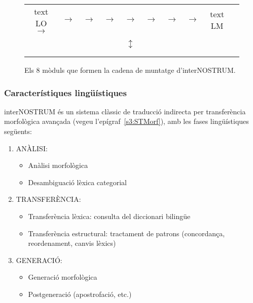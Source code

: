 \begin{figure}
{\small
\setlength{\tabcolsep}{0.5mm}
\begin{center}
\begin{tabular}{cccccccccc}
\\
\parbox{0.7cm}{text LO} $\rightarrow$ &
 $\rightarrow$ &
  $\rightarrow$ &
 $\rightarrow$ &  $\rightarrow$ &
$\rightarrow$ & 
$\rightarrow$ &  $\rightarrow$ &
\parbox{0.7cm}{text LM}\\\\
& &  & & $\updownarrow$   & \\\\
& &
 &  &                 &   \\
\end{tabular}
\end{center}
}
\caption{Els 8 mòduls que formen la cadena de muntatge d'interNOSTRUM.}
\label{fg:modules}
\end{figure}


\subsubsection{Característiques lingüístiques}

{\sf interNOSTRUM} és un sistema clàssic de traducció indirecta per
transferència morfològica avançada (vegeu l'epígraf~\ref{s3:STMorf}),
amb les fases lingüístiques següents:
\begin{enumerate}
\item ANÀLISI: \begin{itemize}
      \item Anàlisi morfològica
      \item Desambiguació lèxica categorial
      \end{itemize}
\item TRANSFERÈNCIA:\begin{itemize}
      \item Transferència lèxica: consulta del diccionari bilingüe
      \item Transferència estructural: tractament de patrons
        (concordança, reordenament, canvis lèxics)\end{itemize}
\item GENERACIÓ:\begin{itemize}
                \item Generació morfològica
                \item Postgeneració (apostrofació, etc.)
                \end{itemize}
\end{enumerate}


